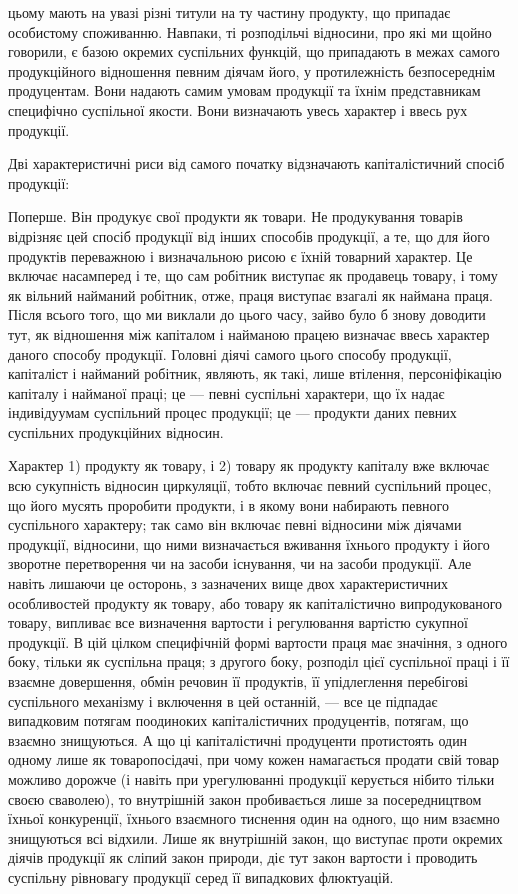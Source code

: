 \parcont{}  %
цьому мають на увазі різні титули на ту частину продукту, що припадає
особистому споживанню. Навпаки, ті розподільчі відносини, про які ми щойно
говорили, є базою окремих суспільних функцій, що припадають в межах самого
продукційного відношення певним діячам його, у протилежність безпосереднім
продуцентам. Вони надають самим умовам продукції та їхнім представникам специфічно
суспільної якости. Вони визначають увесь характер і ввесь рух продукції.

Дві характеристичні риси від самого початку відзначають капіталістичний
спосіб продукції:

Поперше. Він продукує свої продукти як товари. Не продукування товарів
відрізняє цей спосіб продукції від інших способів продукції, а те, що для
його продуктів переважною і визначальною рисою є їхній товарний характер. Це
включає насамперед і те, що сам робітник виступає як продавець товару, і тому
як вільний найманий робітник, отже, праця виступає взагалі як наймана праця.
Після всього того, що ми виклали до цього часу, зайво було б знову доводити
тут, як відношення між капіталом і найманою працею визначає ввесь характер даного
способу продукції. Головні діячі самого цього способу продукції, капіталіст і
найманий робітник, являють, як такі, лише втілення, персоніфікацію капіталу і
найманої праці; це — певні суспільні характери, що їх надає індивідуумам суспільний
процес продукції; це — продукти даних певних суспільних продукційних
відносин.

Характер 1) продукту як товару, і 2) товару як продукту капіталу вже
включає всю сукупність відносин циркуляції, тобто включає певний суспільний
процес, що його мусять проробити продукти, і в якому вони набирають
певного суспільного характеру; так само він включає певні відносини між
діячами продукції, відносини, що ними визначається вживання їхнього продукту
і його зворотне перетворення чи на засоби існування, чи на засоби
продукції. Але навіть лишаючи це осторонь, з зазначених вище двох характеристичних
особливостей продукту як товару, або товару як капіталістично
випродукованого товару, випливає все визначення вартости і регулювання вартістю
сукупної продукції. В цій цілком специфічній формі вартости праця має
значіння, з одного боку, тільки як суспільна праця; з другого боку, розподіл
цієї суспільної праці і її взаємне довершення, обмін речовин її продуктів, її
упідлеглення перебігові суспільного механізму і включення в цей останній, —
все це підпадає випадковим потягам поодиноких капіталістичних продуцентів,
потягам, що взаємно знищуються. А що ці капіталістичні продуценти протистоять
один одному лише як товаропосідачі, при чому кожен намагається
продати свій товар можливо дорожче (і навіть при урегулюванні продукції
керується нібито тільки своєю сваволею), то внутрішній закон пробивається
лише за посередництвом їхньої конкуренції, їхнього взаємного тиснення один
на одного, що ним взаємно знищуються всі відхили. Лише як внутрішній
закон, що виступає проти окремих діячів продукції як сліпий закон природи,
діє тут закон вартости і проводить суспільну рівновагу продукції серед її випадкових
флюктуацій.

